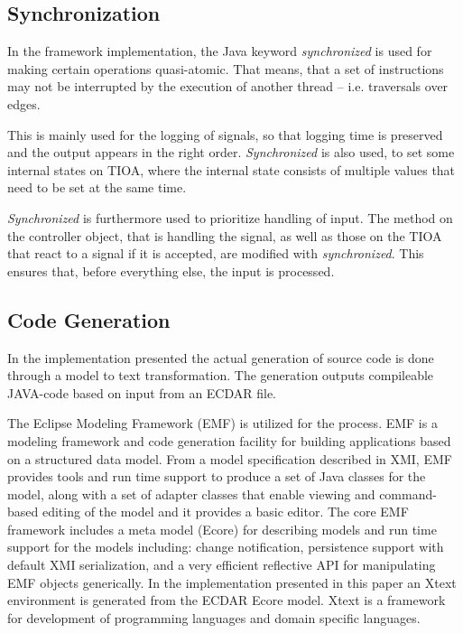 \subsection{Synchronization}

In the framework implementation, the Java keyword \textit{synchronized} is 
used for making certain operations quasi-atomic. That means, that a set of
instructions may not be interrupted by the execution of another thread -- 
i.e. traversals over edges.

This is mainly used for the logging of signals, so that logging time
is preserved and the output appears in the right order. \textit{Synchronized}
is also used, to set some internal states on TIOA, where the internal state
consists of multiple values that need to be set at the same time.

\textit{Synchronized} is furthermore used to prioritize handling of input.  The
method on the controller object, that is handling the signal, as well as those
on the TIOA that react to a signal if it is accepted, are modified with
\textit{synchronized}. This ensures that, before everything else, the input is
processed.


\subsection{Code Generation}
\label{implementation-code-generation}

In the implementation presented the actual generation of source code is done
through a model to text transformation. The generation outputs compileable
JAVA-code based on input from an ECDAR file.

The Eclipse Modeling Framework (EMF) is utilized for the process. EMF is a
modeling framework and code generation facility for building applications based
on a structured data model. From a model specification described in XMI, EMF
provides tools and run time support to produce a set of Java classes for the
model, along with a set of adapter classes that enable viewing and command-based
editing of the model and it provides a basic editor.  The core EMF framework
includes a meta model (Ecore) for describing models and run time support for the
models including: change notification, persistence support with default XMI
serialization, and a very efficient reflective API for manipulating EMF objects
generically. In the implementation presented in this paper an Xtext environment
is generated from the ECDAR Ecore model. Xtext is a framework for development of
programming languages and domain specific languages.

